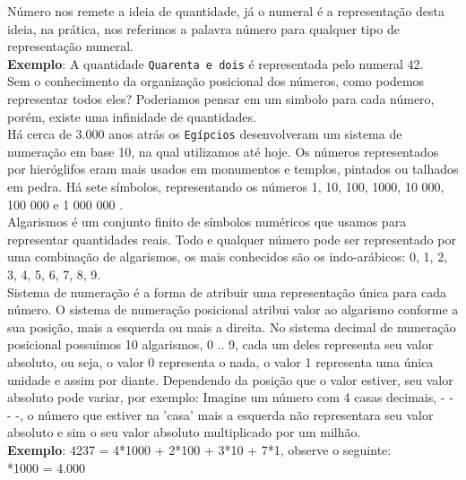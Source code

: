 \documentclass[12pt, onecolumn]{article}
\begin{document}
	Número nos remete a ideia de quantidade, já o numeral é a 
	representação desta ideia, na prática, nos referimos a palavra 
	número para qualquer tipo de representação numeral. \\
	\newline
	\textbf{Exemplo}: A quantidade \texttt{Quarenta e dois} é representada pelo
	numeral 42.\\
	\newline
	Sem o conhecimento da organização posicional dos números, como podemos
	representar todos eles? Poderiamos pensar em um simbolo para cada número,
	porém, existe uma infinidade de quantidades.\\
	\newline
	Há cerca de 3.000 anos atrás os \texttt{Egípcios} desenvolveram um sistema
	de numeração em base 10, na qual utilizamos até hoje. 
	Os números representados por hieróglifos eram mais usados em 
	monumentos e templos, pintados ou talhados em pedra. Há sete símbolos, 
	representando os números 1, 10, 100, 1000, 10 000, 100 000 e 
	1 000 000 \citep{art3}. \\
	\newline
	Algarismos é um conjunto finito de símbolos numéricos que usamos para
	representar quantidades reais. Todo e qualquer número pode ser representado
	por uma combinação de algarismos, os mais conhecidos são os indo-arábicos:
	0, 1, 2, 3, 4, 5, 6, 7, 8, 9. \\
	\newline
	Sistema de numeração é a forma de atribuir uma representação única para 
	cada número. O sistema de numeração posicional atribui valor 
	ao algarismo conforme a sua posição, mais a esquerda ou mais a direita.
	\newline
	No sistema decimal de numeração posicional possuimos 10 algarismos, 0 .. 9,
	cada um deles representa seu valor absoluto, ou seja, o valor 0 
	representa o nada, o valor 1 representa uma única unidade 
	e assim por diante. Dependendo da posição que o valor estiver, 
	seu valor absoluto pode variar, por exemplo: Imagine um número com 
	4 casas decimais, - - - -, o número que estiver na 'casa' mais a esquerda 
	não representara seu valor absoluto e sim o seu valor
	absoluto multiplicado por um milhão. \\
	\newline
	\textbf{Exemplo}: 4237 = 4*1000 + 2*100 + 3*10 + 7*1, observe o seguinte:\\
	*1000 	= 4.000\\
\end{document}
